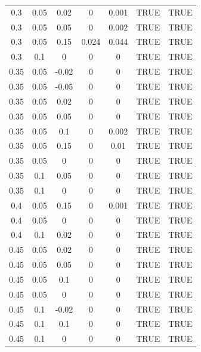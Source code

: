 \documentclass[
10pt, %
a4paper, %
oneside, %
headinclude,footinclude, %
BCOR5mm, %
]{scrartcl}
\begin{document}
\begin{table}[H]
\begin{tabular}{|c|c|c|c|c|c|c|}
		0.3   & 0.05  & 0.02  & 0          & 0.001     & TRUE       & TRUE      \\
		0.3   & 0.05  & 0.05  & 0          & 0.002     & TRUE       & TRUE      \\
		0.3   & 0.05  & 0.15  & 0.024      & 0.044     & TRUE       & TRUE      \\
		0.3   & 0.1   & 0     & 0          & 0         & TRUE       & TRUE      \\
		0.35  & 0.05  & -0.02 & 0          & 0         & TRUE       & TRUE      \\
		0.35  & 0.05  & -0.05 & 0          & 0         & TRUE       & TRUE      \\
		0.35  & 0.05  & 0.02  & 0          & 0         & TRUE       & TRUE      \\
		0.35  & 0.05  & 0.05  & 0          & 0         & TRUE       & TRUE      \\
		0.35  & 0.05  & 0.1   & 0          & 0.002     & TRUE       & TRUE      \\
		0.35  & 0.05  & 0.15  & 0          & 0.01      & TRUE       & TRUE      \\
		0.35  & 0.05  & 0     & 0          & 0         & TRUE       & TRUE      \\
		0.35  & 0.1   & 0.05  & 0          & 0         & TRUE       & TRUE      \\
		0.35  & 0.1   & 0     & 0          & 0         & TRUE       & TRUE      \\
		0.4   & 0.05  & 0.15  & 0          & 0.001     & TRUE       & TRUE      \\
		0.4   & 0.05  & 0     & 0          & 0         & TRUE       & TRUE      \\
		0.4   & 0.1   & 0.02  & 0          & 0         & TRUE       & TRUE      \\
		0.45  & 0.05  & 0.02  & 0          & 0         & TRUE       & TRUE      \\
		0.45  & 0.05  & 0.05  & 0          & 0         & TRUE       & TRUE      \\
		0.45  & 0.05  & 0.1   & 0          & 0         & TRUE       & TRUE      \\
		0.45  & 0.05  & 0     & 0          & 0         & TRUE       & TRUE      \\
		0.45  & 0.1   & -0.02 & 0          & 0         & TRUE       & TRUE      \\
		0.45  & 0.1   & 0.1   & 0          & 0         & TRUE       & TRUE      \\
		0.45  & 0.1   & 0     & 0          & 0         & TRUE       & TRUE      \\

\end{tabular}
\end{table}
\end{document}
